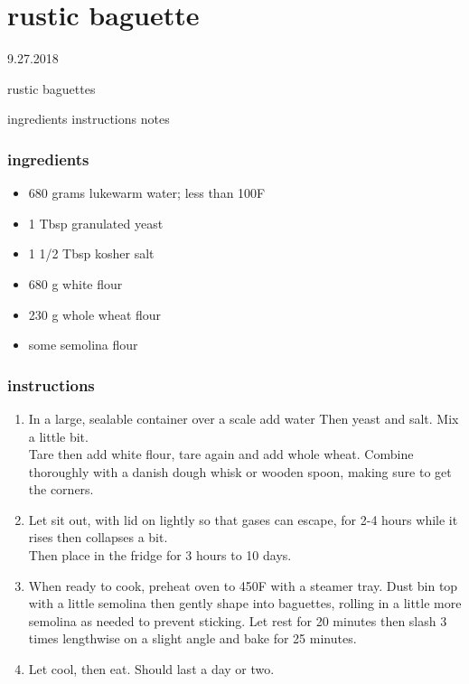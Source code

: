 \documentclass[]{book}
\providecommand{\tightlist}{%
  \setlength{\itemsep}{0pt}\setlength{\parskip}{0pt}}
\begin{document}
\hypertarget{rustic-baguette}{%
\chapter{rustic baguette}\label{rustic-baguette}}

9.27.2018

rustic baguettes

ingredients \textbar{}
instructions \textbar{}
notes

\hypertarget{ingredients-14}{%
\subsection{ingredients}\label{ingredients-14}}

\begin{itemize}
\tightlist
\item
  680 grams lukewarm water; less than 100F
\item
  1 Tbsp granulated yeast
\item
  1 1/2 Tbsp kosher salt
\item
  680 g white flour
\item
  230 g whole wheat flour
\item
  some semolina flour
\end{itemize}

\hypertarget{instructions-14}{%
\subsection{instructions}\label{instructions-14}}

\begin{enumerate}
\def\labelenumi{\arabic{enumi}.}
\tightlist
\item
  In a large, sealable container over a scale add water Then yeast and salt. Mix a little bit.\\
  Tare then add white flour, tare again and add whole wheat. Combine thoroughly with a danish dough
  whisk or wooden spoon, making sure to get the corners.
\item
  Let sit out, with lid on lightly so that gases can escape, for 2-4 hours while it rises then collapses a bit.\\
  Then place in the fridge for 3 hours to 10 days.
\item
  When ready to cook, preheat oven to 450F with a steamer tray. Dust bin top with a little semolina then gently
  shape into baguettes, rolling in a little more semolina as needed to prevent sticking. Let rest for 20 minutes then
  slash 3 times lengthwise on a slight angle and bake for 25 minutes.
\item
  Let cool, then eat. Should last a day or two.
\end{enumerate}
\end{document}
